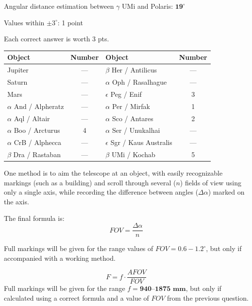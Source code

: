Angular distance estimation between $\gamma$ UMi and Polaris:
$\mathbf{19^\circ}$

Values within $\pm 3^\circ$: \hfill 1 point

Each correct answer is worth 3 pts.

\begin{center}
\begin{tabular}{lc|lc}
Object & Number & Object & Number \\
\hline
Jupiter & --- & $\beta$ Her / Antilicus & --- \\
Saturn & --- & $\alpha$ Oph / Rasalhague & --- \\
Mars & --- & $\epsilon$ Peg / Enif & 3 \\
$\alpha$ And / Alpheratz & --- & $\alpha$ Per / Mirfak & 1 \\
$\alpha$ Aql / Altair & --- & $\alpha$ Sco / Antares & 2 \\
$\alpha$ Boo / Arcturus & 4 & $\alpha$ Ser / Unukalhai & --- \\
$\alpha$ CrB / Alphecca & --- & $\epsilon$ Sgr / Kaus Australis & --- \\
$\beta$ Dra / Rastaban & --- & $\beta$ UMi / Kochab & 5 \\
\end{tabular}
\end{center}

One method is to aim the telescope at an object, with easily recognizable
markings (such as a building) and scroll through several ($n$) fields of
view using only a single axis, while recording the difference between angles
($\Delta\alpha$) marked on the axis.

The final formula is:
\[
FOV = \frac{\Delta\alpha}{n}
\]

Full markings will be given for the range values of
$FOV = 0.6-1.2^\circ$, but only if accompanied with a working method.

\[
F = f \cdot \frac{AFOV}{FOV}
\]
Full markings will be given for the range $f = \textbf{940--1875 mm}$, but
only if calculated using a correct formula and a value of $FOV$ from the
previous question.

